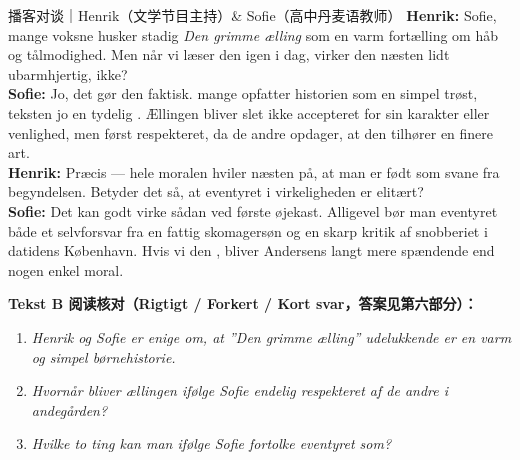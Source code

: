 \begin{emailbox}{播客对谈｜Henrik（文学节目主持）\& Sofie（高中丹麦语教师）}
\textbf{Henrik:} Sofie, mange voksne husker stadig \textit{Den grimme ælling} som en varm fortælling om håb og tålmodighed. Men når vi læser den igen i dag, virker den næsten lidt ubarmhjertig, ikke?\\
\textbf{Sofie:} Jo, det gør den faktisk.  mange opfatter historien som en simpel trøst,  teksten jo en tydelig . Ællingen bliver slet ikke accepteret for sin karakter eller venlighed, men først respekteret, da de andre opdager, at den tilhører en finere art.\\
\textbf{Henrik:} Præcis --- hele moralen hviler næsten på, at man er født som svane fra begyndelsen. Betyder det så, at eventyret i virkeligheden er elitært?\\
\textbf{Sofie:} Det kan godt virke sådan ved første øjekast. Alligevel bør man  eventyret  både et selvforsvar fra en fattig skomagersøn og en skarp kritik af snobberiet i datidens København. Hvis vi  den , bliver Andersens  langt mere spændende end nogen enkel moral.
\end{emailbox}

\textbf{Tekst B 阅读核对（Rigtigt / Forkert / Kort svar，答案见第六部分）：}
\begin{enumerate}
  \item \textit{Henrik og Sofie er enige om, at ”Den grimme ælling” udelukkende er en varm og simpel børnehistorie.} \underline{\hspace{2.2cm}}
  \item \textit{Hvornår bliver ællingen ifølge Sofie endelig respekteret af de andre i andegården?} \underline{\hspace{2.2cm}}
  \item \textit{Hvilke to ting kan man ifølge Sofie fortolke eventyret som?} \underline{\hspace{2.2cm}}
\end{enumerate}


